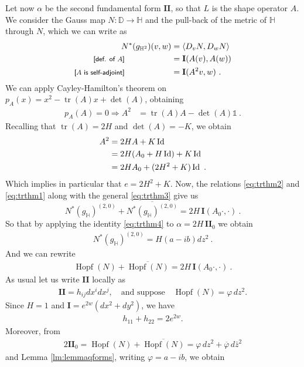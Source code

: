 \documentclass[a4paper,11pt,openright,twoside]{book}
\newcommand{\tr}{\operatorname{tr}}
\newcommand{\I}{\mathbf{I}}
\newcommand{\II}{\mathbf{I\!I}}
\newcommand{\Hopf}{\operatorname{Hopf}}
\newcommand{\Id}{\operatorname{Id}}
\newcommand{\1}{\mathds{1}}
\newcommand{\commb}[1]{\textsf{{\footnotesize[#1]}}}
\theoremstyle{plain}
\theoremstyle{definition}
\theoremstyle{remark}
\begin{document}
Let now $\alpha$ be the second fundamental form $\II$, so that $L$ is the shape operator $A$. We consider the Gauss map $N:\mathbb{D}\to \mathbb{H}$ and the pull-back of the metric of $\mathbb{H}$ through $N$, which we can write as
\begin{align}\label{eq:trthm2}
	N^*(g_{\mathbb{H}^2})(v,w) &= \left<D_vN,D_wN \right> \notag\\
	\commb{def. of $ A$}\hspace{2cm}&=  \I(A(v),A(w)) \notag\\
	\commb{$A$ is self-adjoint}\hspace{2cm}&= \I(A^2v,w) 
\ . 
\end{align}
We can apply Cayley-Hamilton's theorem on $p_A(x) = x^2-\tr(A)x+\det(A)$, obtaining
\begin{align*}
	p_A(A) = 0\Rightarrow A^2 &= \tr(A) A - \det(A) \1
\ . 
\end{align*}
Recalling that $\tr(A)=2H$ and $\det(A)=-K$, we obtain
\begin{align}\label{eq:trthm1}
	A^2 &= 2HA + K\Id \notag\\
	&= 2H(A_0+H\Id)+K\Id \notag\\
	&= 2HA_0 +(2H^2+K)\Id
\ . 
\end{align}
Which implies in particular that $e = 2H^2+K $.
Now, the relations \eqref{eq:trthm2} and \eqref{eq:trthm1} along with the general \eqref{eq:trthm3} give us
\[
	N^*(g_\mathbb{H})^{(2,0)} + \overline{N^*(g_\mathbb{H})^{(2,0)}} = 2H\,\I(A_0\cdot,\cdot)
\ . 
\]
So that by applying the identity \eqref{eq:trthm4} to $\alpha=2H\,\II_0$ we obtain
\begin{align*}
	N^*(g_\mathbb{H})^{(2,0)} = H(a-ib)dz^2
\ . 
\end{align*}
And we can rewrite
\begin{align*}
	\Hopf(N)+\overline{\Hopf(N)} = 2H\,\I(A_0\cdot ,\cdot )
\ . 
\end{align*}
As usual let us write $\II$ locally as
\begin{align*}
	\II =  h_{ij}dx^idx^j,
	\quad\text{and suppose}\quad
	\Hopf(N)=\varphi\,dz^2.
\end{align*}
Since $H=1$ and $\I=e^{2w}(dx^2+dy^2)$, we have
\begin{align*}
	h_{11}+h_{22}=2e^{2w}.
\end{align*}
Moreover, from
\begin{align*}
	2\II_0=\Hopf(N)+\overline{\Hopf(N)}
	=\varphi\,dz^2+\overline{\varphi}\,d\bar z^2
\end{align*}
and Lemma \ref{lm:lemmaqforms}, writing $\varphi=a-ib$, we obtain
\end{document}
